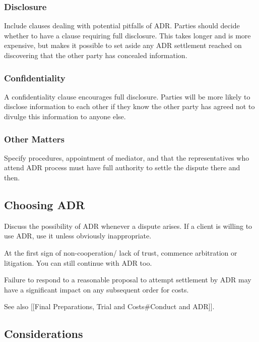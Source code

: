 \documentclass[
]{article}
\begin{document}
\hypertarget{disclosure}{%
\subsubsection{Disclosure}\label{disclosure}}

Include clauses dealing with potential pitfalls of ADR. Parties should
decide whether to have a clause requiring full disclosure. This takes
longer and is more expensive, but makes it possible to set aside any ADR
settlement reached on discovering that the other party has concealed
information.

\hypertarget{confidentiality}{%
\subsubsection{Confidentiality}\label{confidentiality}}

A confidentiality clause encourages full disclosure. Parties will be
more likely to disclose information to each other if they know the other
party has agreed not to divulge this information to anyone else.

\hypertarget{other-matters}{%
\subsubsection{Other Matters}\label{other-matters}}

Specify procedures, appointment of mediator, and that the
representatives who attend ADR process must have full authority to
settle the dispute there and then.

\hypertarget{choosing-adr}{%
\subsection{Choosing ADR}\label{choosing-adr}}

Discuss the possibility of ADR whenever a dispute arises. If a client is
willing to use ADR, use it unless obviously inappropriate.

At the first sign of non-cooperation/ lack of trust, commence
arbitration or litigation. You can still continue with ADR too.

Failure to respond to a reasonable proposal to attempt settlement by ADR
may have a significant impact on any subsequent order for costs.

See also {[}{[}Final Preparations, Trial and Costs\#Conduct and
ADR{]}{]}.

\hypertarget{considerations}{%
\subsection{Considerations}\label{considerations}}
\end{document}
